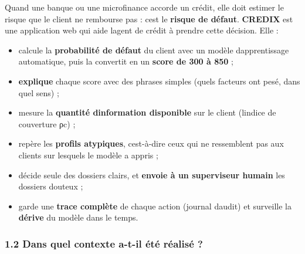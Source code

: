 \documentclass[
  french,
  11pt,
  a4paper,
]{article}
\providecommand{\tightlist}{%
  \setlength{\itemsep}{0pt}\setlength{\parskip}{0pt}}
\begin{document}
Quand une banque ou une microfinance accorde un crédit, elle doit
estimer le risque que le client ne rembourse pas : c\textquotesingle est
le \textbf{risque de défaut}. \textbf{CREDIX} est une application web
qui aide l\textquotesingle agent de crédit à prendre cette décision.
Elle :

\begin{itemize}
\tightlist
\item
  calcule la \textbf{probabilité de défaut} du client avec un modèle
  d\textquotesingle apprentissage automatique, puis la convertit en un
  \textbf{score de 300 à 850} ;
\item
  \textbf{explique} chaque score avec des phrases simples (quels
  facteurs ont pesé, dans quel sens) ;
\item
  mesure la \textbf{quantité d\textquotesingle information disponible}
  sur le client (l\textquotesingle indice de couverture ρc) ;
\item
  repère les \textbf{profils atypiques}, c\textquotesingle est-à-dire
  ceux qui ne ressemblent pas aux clients sur lesquels le modèle a
  appris ;
\item
  décide seule des dossiers clairs, et \textbf{envoie à un superviseur
  humain} les dossiers douteux ;
\item
  garde une \textbf{trace complète} de chaque action (journal
  d\textquotesingle audit) et surveille la \textbf{dérive} du modèle
  dans le temps.
\end{itemize}

\subsubsection{1.2 Dans quel contexte a-t-il été réalisé
?}\label{12-dans-quel-contexte-a-t-il-uxe9tuxe9-ruxe9alisuxe9-}
\end{document}
